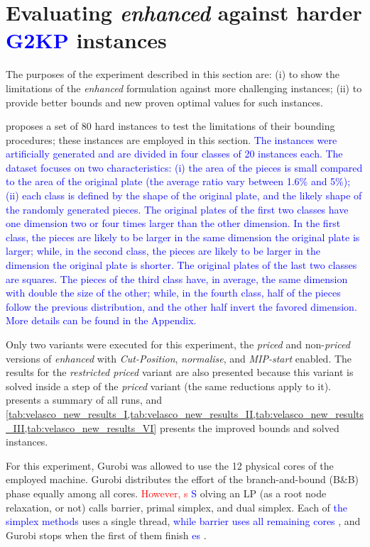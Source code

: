 \documentclass[ppgc,tese,english,formais,babel]{iiufrgs}
\newif\iffinalversion
\newcommand{\newtext}[1]{\iffinalversion%
#1%
\else%
\textcolor{blue}{#1}%
\fi%
}
\newcommand{\oldtext}[1]{\iffinalversion%
\else%
\textcolor{red}{#1}%
\fi%
}
\begin{document}
\section{Evaluating \emph{enhanced} against harder \newtext{G2KP} instances}
\label{sec:new_results}

The purposes of the experiment described in this section are:
(i) to show the limitations of the \emph{enhanced} formulation against more challenging instances;
(ii) to provide better bounds and new proven optimal values for such instances.

\citet{velasco:2019} proposes a set of 80 hard instances to test the limitations of their bounding procedures; these instances are employed in this section.
\newtext{The instances were artificially generated and are divided in four classes of 20 instances each. The dataset focuses on two characteristics: (i) the area of the pieces is small compared to the area of the original plate (the average ratio vary between 1.6\% and 5\%); (ii) each class is defined by the shape of the original plate, and the likely shape of the randomly generated pieces. The original plates of the first two classes have one dimension two or four times larger than the other dimension. In the first class, the pieces are likely to be larger in the same dimension the original plate is larger; while, in the second class, the pieces are likely to be larger in the dimension the original plate is shorter. The original plates of the last two classes are squares. The pieces of the third class have, in average, the same dimension with double the size of the other; while, in the fourth class, half of the pieces follow the previous distribution, and the other half invert the favored dimension. More details can be found in the Appendix.}

Only two variants were executed for this experiment, the \emph{priced} and non-\emph{priced} versions of \emph{enhanced} with \emph{Cut-Position}, \emph{normalise}, and \emph{MIP-start} enabled.
The results for the \emph{restricted priced} variant are also presented because this variant is solved inside a step of the \emph{priced} variant (the same reductions apply to it).
 presents a summary of all runs, and \cref{tab:velasco_new_results_I,tab:velasco_new_results_II,tab:velasco_new_results_III,tab:velasco_new_results_VI} presents the improved bounds and solved instances.

For this experiment, Gurobi was allowed to use the 12 physical cores of the employed machine.
Gurobi distributes the effort of the branch-and-bound (B\&B) phase equally among all cores.
\oldtext{However, s}\newtext{S}olving an LP (as a root node relaxation, or not) calls barrier, primal simplex, and dual simplex.
Each of \newtext{the simplex methods} uses a single thread, \newtext{while barrier uses all remaining cores}, and Gurobi stops when the first of them finish\newtext{es}.
\end{document}
